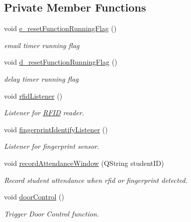\subsection*{Private Member Functions}
\begin{DoxyCompactItemize}
\item 
void \hyperlink{class_main_window_a65bbafe4bc6f641952f4675fc672a664}{e\+\_\+reset\+Function\+Running\+Flag} ()
\begin{DoxyCompactList}\small\item\em email timer running flag \end{DoxyCompactList}\item 
void \hyperlink{class_main_window_a2aa013d9a84e2a19d9cfc876df26b71d}{d\+\_\+reset\+Function\+Running\+Flag} ()
\begin{DoxyCompactList}\small\item\em delay timer running flag \end{DoxyCompactList}\item 
void \hyperlink{class_main_window_af35c36df2b6650b0ea50d6afa5c24874}{rfid\+Listener} ()
\begin{DoxyCompactList}\small\item\em Listener for \hyperlink{class_r_f_i_d}{R\+F\+I\+D} reader. \end{DoxyCompactList}\item 
void \hyperlink{class_main_window_a9abddf234c9231f465917c318b3ba6b2}{fingerprint\+Identify\+Listener} ()
\begin{DoxyCompactList}\small\item\em Listener for fingerprint sensor. \end{DoxyCompactList}\item 
void \hyperlink{class_main_window_a57fcf83e8fc3f5bfcab4ae81240bf119}{record\+Attendance\+Window} (Q\+String student\+I\+D)
\begin{DoxyCompactList}\small\item\em Record student attendance when rfid or fingerprint detected. \end{DoxyCompactList}\item 
void \hyperlink{class_main_window_a12bf819145965a9b41a9bae976be2870}{door\+Control} ()
\begin{DoxyCompactList}\small\item\em Trigger Door Control function. \end{DoxyCompactList}\end{DoxyCompactItemize}
